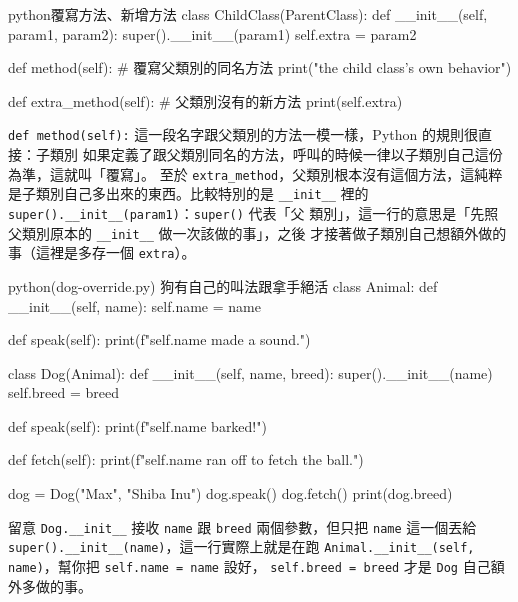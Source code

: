 \begin{code}{python}{覆寫方法、新增方法}
class ChildClass(ParentClass):
    def __init__(self, param1, param2):
        super().__init__(param1)
        self.extra = param2

    def method(self):        # 覆寫父類別的同名方法
        print("the child class's own behavior")

    def extra_method(self):  # 父類別沒有的新方法
        print(self.extra)
\end{code}

\texttt{def method(self):} 這一段名字跟父類別的方法一模一樣，Python 的規則很直接：子類別
如果定義了跟父類別同名的方法，呼叫的時候一律以子類別自己這份為準，這就叫「覆寫」。
至於
\texttt{extra\_method}，父類別根本沒有這個方法，這純粹是子類別自己多出來的東西。比較特別的是
\texttt{\_\_init\_\_} 裡的 \texttt{super().\_\_init\_\_(param1)}：\texttt{super()} 代表「父
類別」，這一行的意思是「先照父類別原本的 \texttt{\_\_init\_\_} 做一次該做的事」，之後
才接著做子類別自己想額外做的事（這裡是多存一個 \texttt{extra}）。

\begin{example}{python}{(dog-override.py) 狗有自己的叫法跟拿手絕活}
class Animal:
    def __init__(self, name):
        self.name = name

    def speak(self):
        print(f"{self.name} made a sound.")


class Dog(Animal):
    def __init__(self, name, breed):
        super().__init__(name)
        self.breed = breed

    def speak(self):
        print(f"{self.name} barked!")

    def fetch(self):
        print(f"{self.name} ran off to fetch the ball.")


dog = Dog("Max", "Shiba Inu")
dog.speak()
dog.fetch()
print(dog.breed)
\end{example}


留意 \texttt{Dog.\_\_init\_\_} 接收 \texttt{name} 跟 \texttt{breed} 兩個參數，但只把
\texttt{name} 這一個丟給 \texttt{super().\_\_init\_\_(name)}，這一行實際上就是在跑
\texttt{Animal.\_\_init\_\_(self, name)}，幫你把 \texttt{self.name = name} 設好，
\texttt{self.breed = breed} 才是 \texttt{Dog} 自己額外多做的事。

